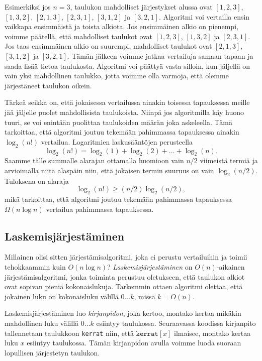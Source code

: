 Esimerkiksi jos $n=3$, taulukon mahdolliset järjestykset alussa ovat
$[1,2,3]$, $[1,3,2]$, $[2,1,3]$, $[2,3,1]$, $[3,1,2]$ ja $[3,2,1]$.
Algoritmi voi vertailla ensin vaikkapa ensimmäistä ja toista alkiota.
Jos ensimmäinen alkio on pienempi, voimme päätellä,
että mahdolliset taulukot ovat $[1,2,3]$, $[1,3,2]$ ja $[2,3,1]$.
Jos taas ensimmäinen alkio on suurempi,
mahdolliset taulukot ovat $[2,1,3]$, $[3,1,2]$ ja $[3,2,1]$.
Tämän jälkeen voimme jatkaa vertailuja samaan tapaan
ja saada lisää tietoa taulukosta.
Algoritmi voi päättyä vasta silloin, kun jäljellä on vain yksi
mahdollinen taulukko, jotta voimme olla varmoja, että olemme
järjestäneet taulukon oikein.

Tärkeä seikka on, että jokaisessa vertailussa ainakin toisessa
tapauksessa meille jää jäljelle puolet mahdollisista taulukoista.
Niinpä jos algoritmilla käy huono tuuri, se voi enintään puolittaa
taulukoiden määrän joka askeleella.
Tämä tarkoittaa, että algoritmi joutuu tekemään pahimmassa
tapauksessa ainakin $\log_2(n!)$ vertailua.
Logaritmien laskusääntöjen perusteella
\[
\log_2(n!) = \log_2(1)+\log_2(2)+\dots+\log_2(n).
\]
Saamme tälle summalle alarajan ottamalla huomioon vain
$n/2$ viimeistä termiä ja arvioimalla niitä alaspäin niin, 
että jokaisen termin suuruus on vain $\log_2(n/2)$. Tuloksena on alaraja
\[
\log_2(n!) \ge (n/2) \log_2(n/2),
\]
mikä tarkoittaa, että algoritmi joutuu tekemään
pahimmassa tapauksessa $\Omega(n \log n)$ vertailua pahimmassa tapauksessa.

\subsection{Laskemisjärjestäminen}

Millainen olisi sitten järjestämisalgoritmi,
joka ei perustu vertailuihin ja toimii
tehokkaammin kuin $O(n \log n)$?
\emph{Laskemisjärjestäminen} on $O(n)$-aikainen järjestämisalgoritmi,
jonka toiminta perustuu oletukseen, että taulukon alkiot
ovat sopivan pieniä kokonaislukuja.
Tarkemmin ottaen algoritmi olettaa, että jokainen luku on
kokonaisluku välillä $0 \dots k$, missä $k=O(n)$.

Laskemisjärjestäminen luo \emph{kirjanpidon}, joka kertoo,
montako kertaa mikä\-kin mahdollinen luku välillä $0 \dots k$
esiintyy taulukossa.
Seuraavassa koodissa kirjanpito tallennetaan
taulukkoon \texttt{kerrat} niin, että
$\texttt{kerrat}[x]$ ilmaisee,
montako kertaa luku $x$ esiintyy taulukossa.
Tämän kirjanpidon avulla voimme luoda suoraan
lopullisen järjestetyn taulukon.

